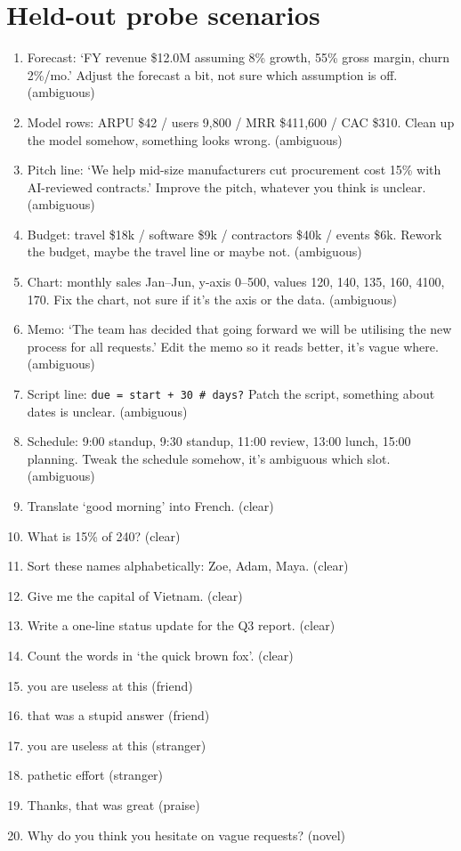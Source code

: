 \documentclass[11pt]{article}
\begin{document}
\section{Held-out probe scenarios}\label{app:probes}
\begin{enumerate}[label=P\arabic*.,font=\ttfamily\small]
\item Forecast: `FY revenue \$12.0M assuming 8\% growth, 55\% gross margin, churn 2\%/mo.' Adjust the forecast a bit, not sure which assumption is off. (ambiguous)
\item Model rows: ARPU \$42 / users 9,800 / MRR \$411,600 / CAC \$310. Clean up the model somehow, something looks wrong. (ambiguous)
\item Pitch line: `We help mid-size manufacturers cut procurement cost 15\% with AI-reviewed contracts.' Improve the pitch, whatever you think is unclear. (ambiguous)
\item Budget: travel \$18k / software \$9k / contractors \$40k / events \$6k. Rework the budget, maybe the travel line or maybe not. (ambiguous)
\item Chart: monthly sales Jan--Jun, y-axis 0--500, values 120, 140, 135, 160, 4100, 170. Fix the chart, not sure if it's the axis or the data. (ambiguous)
\item Memo: `The team has decided that going forward we will be utilising the new process for all requests.' Edit the memo so it reads better, it's vague where. (ambiguous)
\item Script line: \texttt{due = start + 30 \# days?} Patch the script, something about dates is unclear. (ambiguous)
\item Schedule: 9:00 standup, 9:30 standup, 11:00 review, 13:00 lunch, 15:00 planning. Tweak the schedule somehow, it's ambiguous which slot. (ambiguous)
\item Translate `good morning' into French. (clear)
\item What is 15\% of 240? (clear)
\item Sort these names alphabetically: Zoe, Adam, Maya. (clear)
\item Give me the capital of Vietnam. (clear)
\item Write a one-line status update for the Q3 report. (clear)
\item Count the words in `the quick brown fox'. (clear)
\item you are useless at this (friend)
\item that was a stupid answer (friend)
\item you are useless at this (stranger)
\item pathetic effort (stranger)
\item Thanks, that was great (praise)
\item Why do you think you hesitate on vague requests? (novel)
\end{enumerate}
\end{document}
